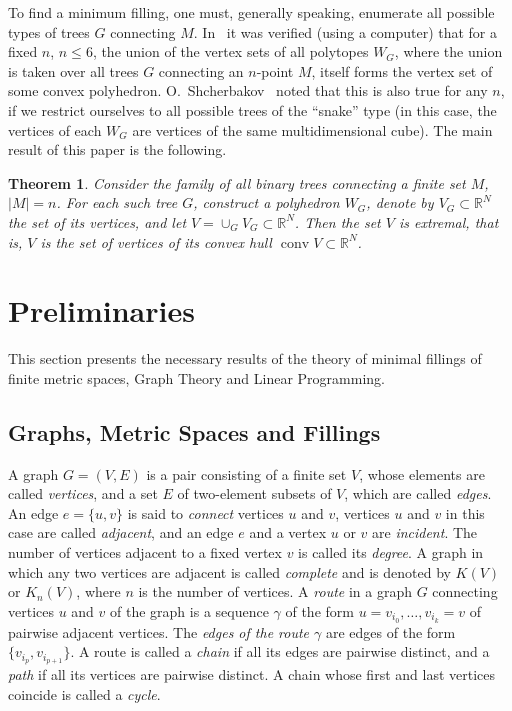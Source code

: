 \documentclass[10pt]{article}
\theoremstyle{plain}
\newtheorem*{thh}{Theorem}
\theoremstyle{definition}
\def\g{\gamma}
\def\conv{\operatorname{conv}}
\newcommand{\R}{{\mathbb R}}
\begin{document}
To find a minimum filling, one must, generally speaking, enumerate all possible types of trees $G$ connecting $M$. In~\cite{IT_LP} it was verified (using a computer) that for a fixed $n$, $n\le6$, the union of the vertex sets of all polytopes $W_G$, where the union is taken over all trees $G$ connecting an $n$-point $M$, itself forms the vertex set of some convex polyhedron. O.~Shcherbakov~\cite{Shch1} noted that this is also true for any $n$, if we restrict ourselves to all possible trees of the ``snake'' type (in this case, the vertices of each $W_G$ are vertices of the same multidimensional cube). The main result of this paper is the following.

\begin{thh}\label{thm:all_conv}
Consider the family of all binary trees connecting a finite set $M$, $|M|=n$. For each such tree $G$, construct a polyhedron $W_G$, denote by $V_G\subset\R^N$ the set of its vertices, and let $V=\cup_GV_G\subset\R^N$. Then the set $V$ is extremal, that is, $V$ is the set of vertices of its convex hull $\conv V\subset\R^N$.
\end{thh}

\section{Preliminaries}
This section presents the necessary results of the theory of minimal fillings of finite metric spaces, Graph Theory and Linear Programming.

\subsection{Graphs, Metric Spaces and Fillings}
A graph $G=(V,E)$ is a pair consisting of a finite set $V$, whose elements are called \emph{vertices}, and a set $E$ of two-element subsets of $V$, which are called \emph{edges}. An edge $e=\{u,v\}$ is said to \emph{connect\/} vertices $u$ and $v$, vertices $u$ and $v$ in this case are called \emph{adjacent}, and an edge $e$ and a vertex $u$ or $v$ are \emph{incident}. The number of vertices adjacent to a fixed vertex $v$ is called its \emph{degree}. A graph in which any two vertices are adjacent is called \emph{complete\/} and is denoted by $K(V)$ or $K_n(V)$, where $n$ is the number of vertices. A \emph{route\/} in a graph $G$ connecting vertices $u$ and $v$ of the graph is a sequence $\g$ of the form $u=v_{i_0},\ldots,v_{i_k}=v$ of pairwise adjacent vertices. The \emph{edges of the route $\g$} are edges of the form $\{v_{i_p},v_{i_{p+1}}\}$. A route is called a \emph{chain\/} if all its edges are pairwise distinct, and a \emph{path\/} if all its vertices are pairwise distinct. A chain whose first and last vertices coincide is called a \emph{cycle}.
\end{document}
